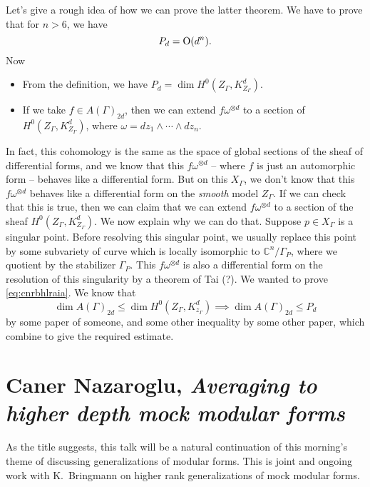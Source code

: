 \documentclass[reqno]{amsart} 
\numberwithin{theorem}{section}
\numberwithin{equation}{section}
\begin{document}
Let's give a rough idea of how we can prove the latter theorem.  We have to prove that for $n > 6$, we have
\begin{equation}\label{eq:cnrbhlraia}
  P_d = \operatorname{O}(d^n).
\end{equation}
Now
\begin{itemize}
\item From the definition, we have $P_d = \dim H^0(Z_\Gamma, K_{Z_\Gamma}^d)$.
\item If we take $f \in A(\Gamma)_{2 d}$, then we can extend $f \omega^{\otimes d}$ to a section of $H^0(Z_\Gamma, K_{Z_\Gamma}^d)$, where $\omega = d z_1 \wedge \dotsb \wedge d z_n$.
\end{itemize}
In fact, this cohomology is the same as the space of global sections of the sheaf of differential forms, and we know that this $f \omega^{\otimes d}$ -- where $f$ is just an automorphic form -- behaves like a differential form.  But on this $X_\Gamma$, we don't know that this $f \omega^{\otimes d}$ behaves like a differential form on the \emph{smooth} model $Z_\Gamma$.  If we can check that this is true, then we can claim that we can extend $f \omega^{\otimes d}$ to a section of the sheaf $H^0(Z_\Gamma, K_{Z_\Gamma}^d)$.  We now explain why we can do that.  Suppose $p \in X_\Gamma$ is a singular point.  Before resolving this singular point, we usually replace this point by some subvariety of curve which is locally isomorphic to $\mathbb{C}^n / \Gamma_P$, where we quotient by the stabilizer $\Gamma_P$.  This $f \omega^{\otimes d}$ is also a differential form on the resolution of this singularity by a theorem of Tai (?).  We wanted to prove \eqref{eq:cnrbhlraia}.  We know that
\begin{equation*}
  \dim A(\Gamma)_{2 d} \leq \dim H^0(Z_\Gamma, K_{z_\Gamma}^d) \implies \dim A(\Gamma)_{2 d} \leq P_d
\end{equation*}
by some paper of someone, and some other inequality by some other paper, which combine to give the required estimate.

\section{Caner Nazaroglu, \emph{Averaging to higher depth mock modular forms}}

As the title suggests, this talk will be a natural continuation of this morning's theme of discussing generalizations of modular forms.  This is joint and ongoing work with K.\ Bringmann on higher rank generalizations of mock modular forms.
\end{document}
